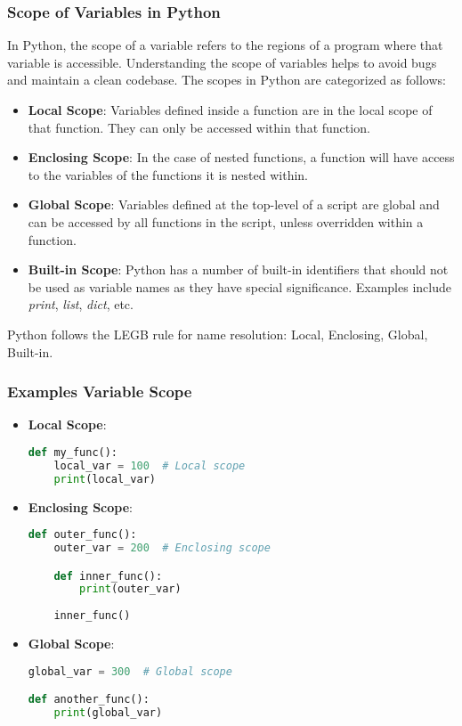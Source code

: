 \begin{frame}
  \frametitle{Scope of Variables in Python}

  In Python, the scope of a variable refers to the regions of a program where that variable is accessible. Understanding the scope of variables helps to avoid bugs and maintain a clean codebase. The scopes in Python are categorized as follows:

  \begin{itemize}
    \item \textbf{Local Scope}: Variables defined inside a function are in the local scope of that function. They can only be accessed within that function.
    \item \textbf{Enclosing Scope}: In the case of nested functions, a function will have access to the variables of the functions it is nested within.
    \item \textbf{Global Scope}: Variables defined at the top-level of a script are global and can be accessed by all functions in the script, unless overridden within a function.
    \item \textbf{Built-in Scope}: Python has a number of built-in identifiers that should not be used as variable names as they have special significance. Examples include \textit{print}, \textit{list}, \textit{dict}, etc.
  \end{itemize}
  
  Python follows the LEGB rule for name resolution: Local, Enclosing, Global, Built-in.
\end{frame}

\begin{frame}[fragile]
  \frametitle{Examples Variable Scope}

  \begin{itemize}
    \item \textbf{Local Scope}:
    \begin{lstlisting}[language=Python]
def my_func():
    local_var = 100  # Local scope
    print(local_var)
    \end{lstlisting}
    
    \item \textbf{Enclosing Scope}:
    \begin{lstlisting}[language=Python]
def outer_func():
    outer_var = 200  # Enclosing scope

    def inner_func():
        print(outer_var)
    
    inner_func()
    \end{lstlisting}

    \item \textbf{Global Scope}:
    \begin{lstlisting}[language=Python]
global_var = 300  # Global scope

def another_func():
    print(global_var)
    \end{lstlisting}
  \end{itemize}
\end{frame}


